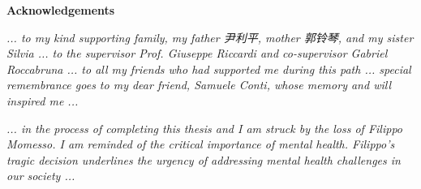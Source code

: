 \thispagestyle{empty}

\begin{center}
  {\bf \Huge Acknowledgements}
\end{center}

\vspace{4cm}


\emph{... to my kind supporting family, my father 尹利平, mother 郭铃琴, and my sister Silvia ... to the supervisor Prof. Giuseppe Riccardi and co-supervisor Gabriel Roccabruna ... to all my friends who had supported me during this path ... special remembrance goes to my dear friend, Samuele Conti, whose memory and will inspired me ... }

\vspace{1em}

\emph{ ... in the process of completing this thesis and I am struck by the loss of Filippo Momesso. I am reminded of the critical importance of mental health. Filippo's tragic decision underlines the urgency of addressing mental health challenges in our society ... }